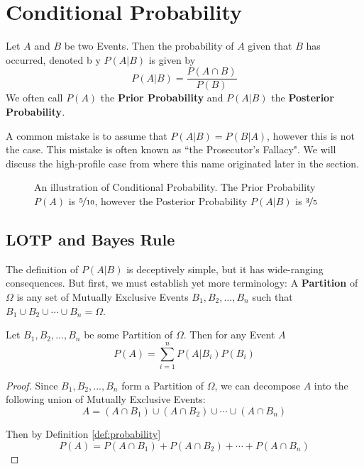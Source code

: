 \documentclass{report}
\begin{document}
\section{Conditional Probability}
Let $A$ and $B$ be two Events. Then the probability of $A$ given that $B$ has occurred, denoted b y $P(A\vert B)$ is given by
\[
    P(A\vert B)=\frac{P(A\cap B)}{P(B)}
\]
We often call $P(A)$ the \textbf{Prior Probability} and $P(A\vert B)$ the \textbf{Posterior Probability}.
\begin{notsofast}
    A common mistake is to assume that $P(A\vert B)=P(B\vert A)$, however this is not the case. This mistake is often known as ``the Prosecutor's Fallacy". We will discuss the high-profile case from where this name originated later in the section.
\end{notsofast}

\begin{figure}
    \centering
    
    \caption{An illustration of Conditional Probability. The Prior Probability $P(A)$ is $\nicefrac 5{10}$, however the Posterior Probability $P(A|B)$ is $\nicefrac 35$}
    \label{fig:dependence}
\end{figure}

\subsection{LOTP and Bayes Rule}
The definition of $P(A\vert B)$ is deceptively simple, but it has wide-ranging consequences. But first, we must establish yet more terminology: A \textbf{Partition} of $\Omega$ is any set of Mutually Exclusive Events $B_1,B_2,...,B_n$ such that $B_1\cup B_2\cup\cdots \cup B_n=\Omega$.

\begin{theorem} Let $B_1,B_2,...,B_n$ be some Partition of $\Omega$. Then for any Event $A$
\[
    P(A)=\sum_{i=1}^n P(A\vert B_i) P(B_i)
\]

\begin{proof}
    Since $B_1,B_2,...,B_n$ form a Partition of $\Omega$, we can decompose $A$ into the following union of Mutually Exclusive Events:
    \[
        A=(A\cap B_1)\cup (A\cap B_2) \cup \cdots \cup (A\cap B_n)
    \]
    \begin{center}
        
    \end{center}
    Then by Definition \ref{def:probability}
    \[
        P(A)=P(A\cap B_1)+ P(A\cap B_2)+ \cdots + P(A\cap B_n)
    \]
\end{proof}
\end{theorem}
\end{document}
